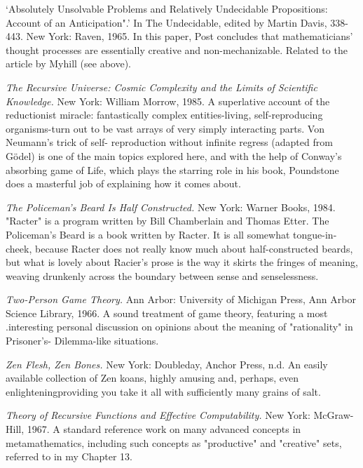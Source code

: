  `Absolutely Unsolvable Problems and Relatively Undecidable Propositions: Account of an Anticipation".' In The Undecidable, edited by Martin Davis, 338-443. New York: Raven, 1965. In this paper, Post concludes that mathematicians' thought processes are essentially creative and non-mechanizable. Related to the article by Myhill (see above).

 {\sl The Recursive Universe: Cosmic Complexity and the Limits of Scientific Knowledge.} New York: William Morrow, 1985. A superlative account of the reductionist miracle: fantastically complex entities-living, self-reproducing organisms-turn out to be vast arrays of very simply interacting parts. Von Neumann's trick of self- reproduction without infinite regress (adapted from Gödel) is one of the main topics explored here, and with the help of Conway's absorbing game of Life, which plays the starring role in his book, Poundstone does a masterful job of explaining how it comes about.

 {\sl The Policeman's Beard Is Half Constructed.} New York: Warner Books, 1984. "Racter" is a program written by Bill Chamberlain and Thomas Etter. The Policeman's Beard is a book written by Racter. It is all somewhat tongue-in-cheek, because Racter does not really know much about half-constructed beards, but what is lovely about Racier's prose is the way it skirts the fringes of meaning, weaving drunkenly across the boundary between sense and senselessness.

 {\sl Two-Person Game Theory.} Ann Arbor: University of Michigan Press, Ann Arbor Science Library, 1966. A sound treatment of game theory, featuring a most .interesting personal discussion on opinions about the meaning of "rationality" in Prisoner's- Dilemma-like situations.

 {\sl Zen Flesh, Zen Bones.} New York: Doubleday, Anchor Press, n.d. An easily available collection of Zen koans, highly amusing and, perhaps, even enlighteningproviding you take it all with sufficiently many grains of salt.

 {\sl Theory of Recursive Functions and Effective Computability.} New York: McGraw-Hill, 1967. A standard reference work on many advanced concepts in metamathematics, including such concepts as "productive" and "creative" sets, referred to in my Chapter 13.


